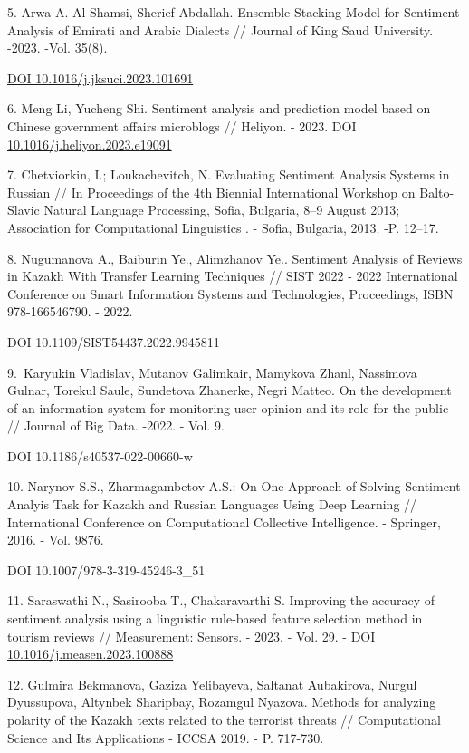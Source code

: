 5. Arwa A. Al Shamsi, Sherief Abdallah. Ensemble Stacking Model for
Sentiment Analysis of Emirati and Arabic Dialects // Journal of King
Saud University. -2023. -Vol. 35(8).

\href{https://doi.org/10.1016/j.jksuci.2023.101691}{DOI
10.1016/j.jksuci.2023.101691}

6. Meng Li, Yucheng Shi. Sentiment analysis and prediction model based
on Chinese government affairs microblogs // Heliyon. - 2023. DOI
\href{https://doi.org/10.1016/j.heliyon.2023.e19091}{10.1016/j.heliyon.2023.e19091}

7. Chetviorkin, I.; Loukachevitch, N. Evaluating Sentiment Analysis
Systems in Russian // In Proceedings of the 4th Biennial International
Workshop on Balto-Slavic Natural Language Processing, Sofia, Bulgaria,
8--9 August 2013; Association for Computational Linguistics . - Sofia,
Bulgaria, 2013. -P. 12--17.

8. Nugumanova A., Baiburin Ye., Alimzhanov Ye.. Sentiment Analysis of
Reviews in Kazakh With Transfer Learning Techniques // SIST 2022 - 2022
International Conference on Smart Information Systems and Technologies,
Proceedings, ISBN 978-166546790. - 2022.

DOI 10.1109/SIST54437.2022.9945811

9.~Karyukin Vladislav, Mutanov Galimkair, Mamykova Zhanl, Nassimova
Gulnar, Torekul Saule, Sundetova Zhanerke, Negri Matteo. On the
development of an information system for monitoring user opinion and its
role for the public // Journal of Big Data. -2022. - Vol. 9.

DOI 10.1186/s40537-022-00660-w

10. Narynov S.S., Zharmagambetov A.S.: On One Approach of Solving
Sentiment Analyis Task for Kazakh and Russian Languages Using Deep
Learning // International Conference on Computational Collective
Intelligence. - Springer, 2016. - Vol. 9876.

DOI 10.1007/978-3-319-45246-3\_51

11. Saraswathi N., Sasirooba T., Chakaravarthi S. Improving the accuracy
of sentiment analysis using a linguistic rule-based feature selection
method in tourism reviews // Measurement: Sensors. - 2023. - Vol. 29. -
DOI
\href{https://doi.org/10.1016/j.measen.2023.100888}{10.1016/j.measen.2023.100888}

12. Gulmira Bekmanova, Gaziza Yelibayeva, Saltanat Aubakirova, Nurgul
Dyussupova, Altynbek Sharipbay, Rozamgul Nyazova. Methods for analyzing
polarity of the Kazakh texts related to the terrorist threats //
Computational Science and Its Applications - ICCSA 2019. - P. 717-730.

